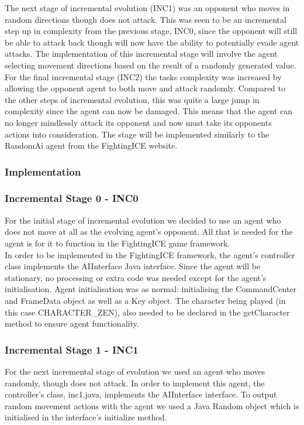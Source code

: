 \documentclass[12pt,a4paper]{article}
\begin{document}
The next stage of incremental evolution (INC1) was an opponent who moves in random directions though does not attack. This was seen to be an incremental step up in complexity from the previous stage, INC0, since the opponent will still be able to attack back though will now have the ability to potentially evade agent attacks. The implementation of this incremental stage will involve the agent selecting movement directions based on the result of a randomly generated value.\\

For the final incremental stage (INC2) the tasks complexity was increased by allowing the opponent agent to both move and attack randomly. Compared to the other steps of incremental evolution, this was quite a large jump in complexity since the agent can now be damaged. This means that the agent can no longer mindlessly attack its opponent and now must take its opponents actions into consideration. The stage will be implemented similarly to the RandomAi agent from the FightingICE website.\\
\newpage
\subsubsection{Implementation}
\subsubsection*{Incremental Stage 0 - INC0}
For the initial stage of incremental evolution we decided to use an agent who does not move at all as the evolving agent's opponent. All that is needed for the agent is for it to function in the FightingICE game framework.\\

In order to be implemented in the FightingICE framework, the agent's controller class implements the AIInterface Java interface. Since the agent will be stationary, no processing or extra code was needed except for the agent's initialisation. Agent initialisation was as normal: initialising the CommandCenter and FrameData object as well as a Key object. The character being played (in this case CHARACTER\_ZEN), also needed to be declared in the getCharacter method to ensure agent functionality.

\subsubsection*{Incremental Stage 1 - INC1}
For the next incremental stage of evolution we used an agent who moves randomly, though does not attack. In order to implement this agent, the controller's class, inc1.java, implements the AIInterface interface. To output random movement actions with the agent we used a Java Random object which is initialised in the interface's initialize method.\\
\end{document}
